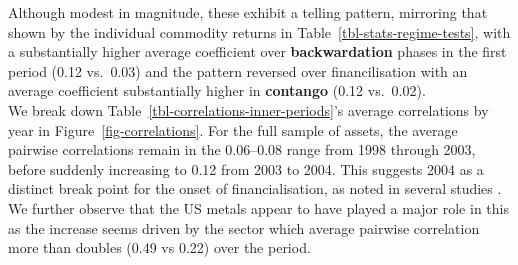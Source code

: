 \documentclass[
  authoryear,
  preprint,
  3p]{elsarticle}
\begin{document}
Although modest in magnitude, these exhibit a telling pattern, mirroring
that shown by the individual commodity returns in
Table~\ref{tbl-stats-regime-tests}, with a substantially higher average
coefficient over \textbf{backwardation} phases in the first period (0.12
vs.~0.03) and the pattern reversed over financilisation with an average
coefficient substantially higher in \textbf{contango} (0.12 vs.~0.02).\\
We break down Table~\ref{tbl-correlations-inner-periods}'s average
correlations by year in Figure~\ref{fig-correlations}. For the full
sample of assets, the average pairwise correlations remain in the
0.06--0.08 range from 1998 through 2003, before suddenly increasing to
0.12 from 2003 to 2004. This suggests 2004 as a distinct break point for
the onset of financialisation, as noted in several studies
\citep{baker_financialization_2021, tang_index_2012}. We further observe
that the US metals appear to have played a major role in this as the
increase seems driven by the sector which average pairwise correlation
more than doubles (0.49 vs 0.22) over the period.

\medskip
\end{document}
